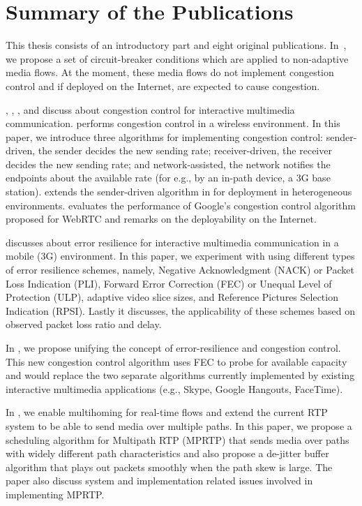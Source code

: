 \section{Summary of the Publications}

This thesis consists of an introductory part and eight original publications.
In~, we propose a set of circuit-breaker conditions which are
applied to non-adaptive media flows. At the moment, these media flows do not
implement congestion control and if deployed on the Internet, are expected to
cause congestion.

, , , and 
discuss about congestion control for interactive multimedia communication.
 performs congestion control in a wireless environment. In
this paper, we introduce three algorithms for implementing congestion control:
sender-driven, the sender decides the new sending rate; receiver-driven, the
receiver decides the new sending rate; and network-assisted, the network
notifies the endpoints about the available rate (for e.g., by an in-path
device, a 3G base station).  extends the sender-driven
algorithm in  for deployment in heterogeneous environments.
 evaluates the performance of Google's congestion control
algorithm proposed for WebRTC and remarks on the deployability on the
Internet.

 discusses about error resilience for interactive multimedia
communication in a mobile (3G) environment. In this paper, we experiment with
using different types of error resilience schemes, namely, Negative
Acknowledgment (NACK) or Packet Loss Indication (PLI), Forward Error
Correction (FEC) or Unequal Level of Protection (ULP), adaptive video slice
sizes, and Reference Pictures Selection Indication (RPSI). Lastly it
discusses, the applicability of these schemes based on observed packet loss
ratio and delay.

In , we propose unifying the concept of error-resilience and
congestion control. This new congestion control algorithm uses FEC to probe
for available capacity and would replace the two separate algorithms currently
implemented by existing interactive multimedia applications (e.g., Skype,
Google Hangouts, FaceTime).


In , we enable multihoming for real-time flows and extend the
current RTP system to be able to send media over multiple paths. In this
paper, we propose a scheduling algorithm for Multipath RTP (MPRTP) that sends
media over paths with widely different path characteristics and also propose a
de-jitter buffer algorithm that plays out packets smoothly when the path skew
is large. The paper also discuss system and implementation related issues
involved in implementing MPRTP.

